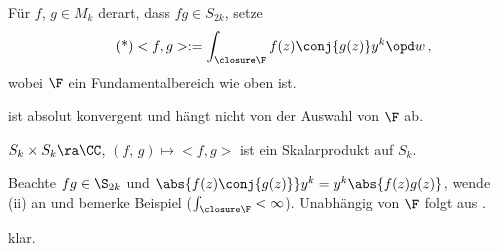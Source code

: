\begin{defi}
	Für $f$, $g \in M_k$ derart, dass $fg \in S_{2k}$, setze
	\[\tag{*}
		<f, g> := \int_{\closure\F} f(z) \conj{g(z)} y^k \opd w
		\,,
	\]
	wobei $\F$ ein Fundamentalbereich wie oben ist.
\end{defi}

\begin{satz-list}
	\item \myref{(*)} ist absolut konvergent und hängt nicht von der Auswahl von $\F$ ab.
	\item $S_k \times S_k \ra \CC$, $(f,\,g) \mapsto <f,g>$ ist ein Skalarprodukt auf $S_k$.
\end{satz-list}

\begin{bewe-list}
	\item Beachte $fg \in \S_{2k}$ und $\abs{f(z)\conj{g(z)}} y^k = y^k \abs{f(z)g(z)}$, wende  (ii) an und bemerke Beispiel ($\int_{\closure \F} < \infty$).
	Unabhängig von $\F$ folgt aus .
	\item klar.
\end{bewe-list}